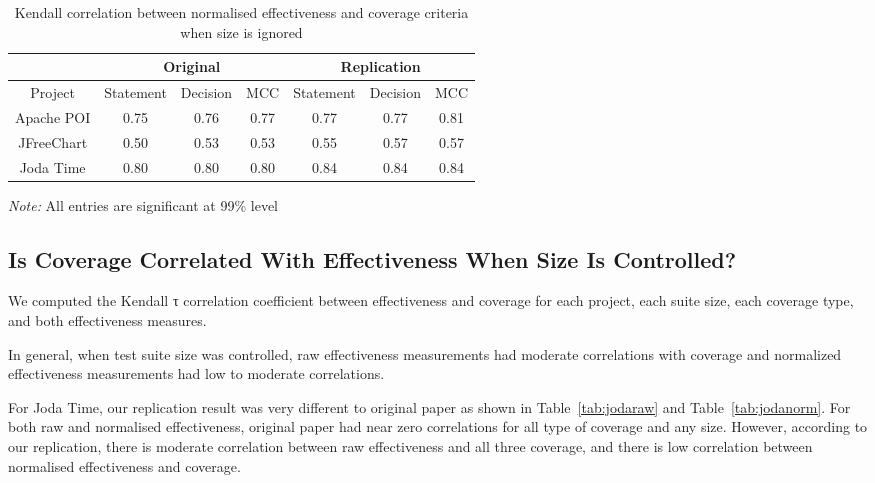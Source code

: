 \begin{table}[h]
	\caption{Kendall correlation between normalised effectiveness and coverage criteria when size is ignored}
	\label{tab:normalnosize}
	\begin{minipage}{0.7\columnwidth}
		\begin{center}
			\begin{tabular}{cccc|ccc}
				\toprule
				& \multicolumn{3}{c}{Original} & \multicolumn{3}{c}{Replication} \\
				\hline
				Project & Statement & Decision & MCC & Statement & Decision & MCC  \\
				\hline
				Apache POI & 0.75 & 0.76 & 0.77 & 0.77& 0.77 & 0.81 \\
				JFreeChart &0.50 & 0.53 & 0.53 & 0.55 & 0.57 & 0.57 \\
				Joda Time & 0.80 & 0.80 & 0.80 & 0.84 & 0.84 & 0.84 \\
				\hline
			\end{tabular}
		\end{center}
		\bigskip
		\emph{Note:} All entries are significant at 99\% level
	\end{minipage}
\end{table}



\subsection{Is Coverage Correlated With Effectiveness When Size Is Controlled?}
We computed the Kendall τ correlation coefficient between effectiveness and coverage for each project, each suite size, each coverage type, and both effectiveness measures.

In general, when test suite size was controlled, raw effectiveness measurements had moderate correlations with coverage and normalized effectiveness measurements had low to moderate correlations.

For Joda Time, our replication result was very different to original paper as shown in Table~\ref{tab:jodaraw} and Table~\ref{tab:jodanorm}. For both raw and normalised effectiveness, original paper had near zero correlations for all type of coverage and any size. However, according to our replication, there is moderate correlation between raw effectiveness and all three coverage, and there is low correlation between normalised effectiveness and coverage.



